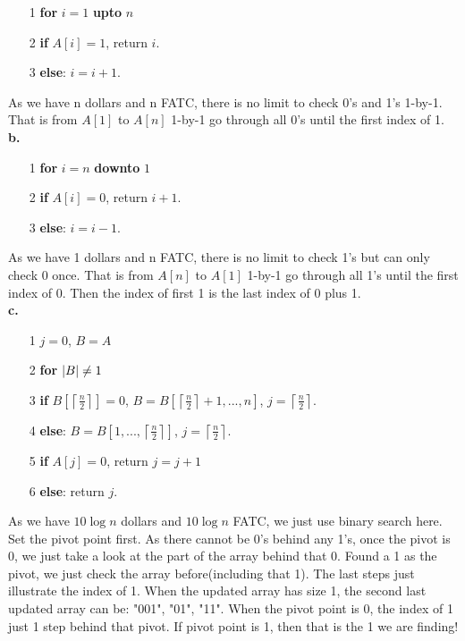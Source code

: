 \documentclass{article}
\theoremstyle{plain}
\begin{document}
\begin{enumerate}
    \item[1] \textbf{for} $i = 1$ \textbf{upto} $n$
    \item[2] \quad \quad \textbf{if} $A[i] = 1$, return $i$.
    \item[3] \quad \quad \textbf{else}: $i = i + 1$.
\end{enumerate}
As we have n dollars and n FATC, there is no limit to check 0's and 1's 1-by-1. That is from $A[1]$ to $A[n]$ 1-by-1 go through all 0's until the first index of 1.\\
\textbf{b.\\} 
\begin{enumerate}
    \item[1] \textbf{for} $i = n$ \textbf{downto} $1$
    \item[2] \quad \quad \textbf{if} $A[i] = 0$, return $i + 1$.
    \item[3] \quad \quad \textbf{else}: $i = i - 1$.
\end{enumerate}
As we have 1 dollars and n FATC, there is no limit to check 1's but can only check 0 once. That is from $A[n]$ to $A[1]$ 1-by-1 go through all 1's until the first index of 0. Then the index of first 1 is the last index of 0 plus 1.\\
\textbf{c.\\} 
\begin{enumerate}
    \item[1] $j = 0$, $B = A$
    \item[2] \textbf{for} $\abs{B} \ne 1$
    \item[3] \quad \quad \textbf{if} $B[\left \lceil \frac{n}{2} \right \rceil] = 0$, $B = B[\left \lceil \frac{n}{2} \right \rceil + 1,..., n]$, $j = \left \lceil \frac{n}{2} \right \rceil$.
    \item[4] \quad \quad \textbf{else}: $B = B[1,..., \left \lceil \frac{n}{2} \right \rceil]$, $j = \left \lceil \frac{n}{2} \right \rceil$.
    \item[5] \textbf{if} $A[j] = 0$, return $j = j + 1$
    \item[6] \textbf{else}: return $j$.
\end{enumerate}
As we have $10\log n$ dollars and $10\log n$ FATC, we just use binary search here. Set the pivot point first. As there cannot be 0's behind any 1's, once the pivot is 0, we just take a look at the part of the array behind that 0. Found a 1 as the pivot, we just check the array before(including that 1). The last steps just illustrate the index of 1. When the updated array has size 1, the second last updated array can be: "001", "01", "11". When the pivot point is 0, the index of 1 just 1 step behind that pivot. If pivot point is 1, then that is the 1 we are finding!\\
\end{document}
